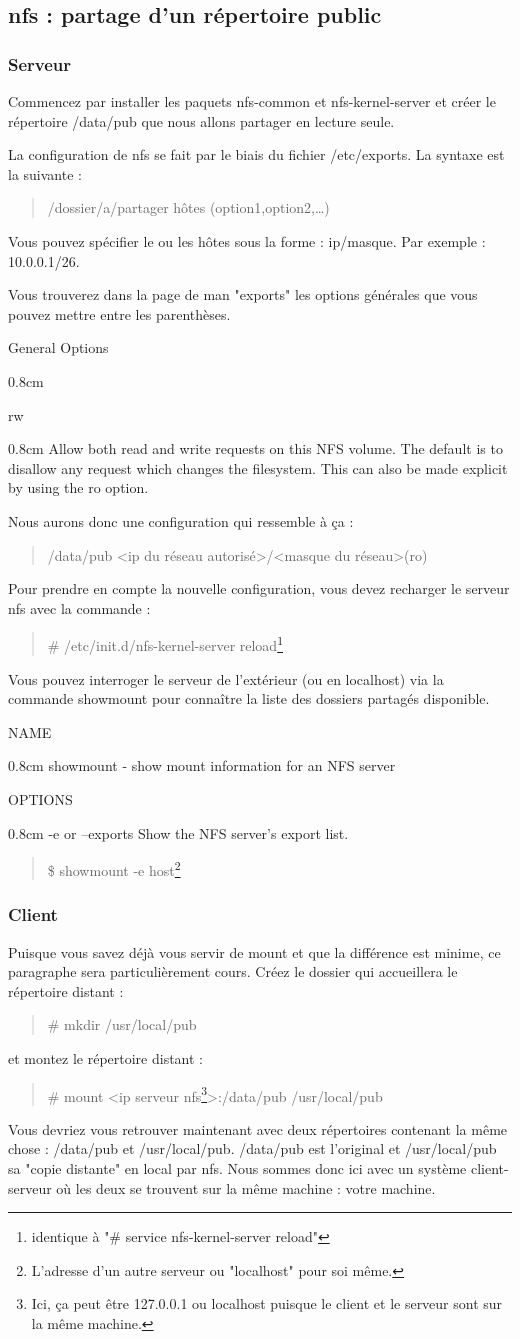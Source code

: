 \documentclass[a4paper,11pt]{article}
\newcommand{\commande}[1] {
    \begin{quote}
    \tt\raggedright #1
    \end{quote}
}
\newcommand{\man}[2]{
    \begin{tcolorbox}[toprule=3mm,width=\textwidth,outer arc=0mm,colbacktitle=grayman,coltitle=black,colback={grayman},colframe={grayman},title={man : \tt #1}]
        \tt\raggedright #2
    \end{tcolorbox}
}
\newcommand{\mandesc}[1]{
    \begin{adjustwidth}{0.8cm}{}
        #1
    \end{adjustwidth}
}
\begin{document}
\subsection{nfs : partage d'un répertoire public}

\subsubsection{Serveur}
\par Commencez par installer les paquets nfs-common et nfs-kernel-server et créer le répertoire /data/pub que nous allons partager en lecture seule.
\par La configuration de nfs se fait par le biais du fichier /etc/exports. La syntaxe est la suivante :
\commande{/dossier/a/partager hôtes (option1,option2,\dots)}
\par Vous pouvez spécifier le ou les hôtes sous la forme : ip/masque. Par exemple : 10.0.0.1/26.
\par Vous trouverez dans la page de man "exports" les options générales que vous pouvez mettre entre les parenthèses.
\man{exports}{
General Options
\mandesc{
rw
\mandesc{Allow both read and write requests on this NFS volume. The default is to disallow any request which changes the filesystem.  This can also be made explicit by using the ro option.}
}}
\par Nous aurons donc une configuration qui ressemble à ça :
\commande{/data/pub <ip du réseau autorisé>/<masque du réseau>(ro)}
\par Pour prendre en compte la nouvelle configuration, vous devez recharger le serveur nfs avec la commande :
\commande{\# /etc/init.d/nfs-kernel-server reload\footnote{identique à "\# service nfs-kernel-server reload"}}
\par Vous pouvez interroger le serveur de l'extérieur (ou en localhost) via la commande showmount pour connaître la liste des dossiers partagés disponible.
\man{showmount}{NAME
\mandesc{showmount - show mount information for an NFS server}
OPTIONS
\mandesc{-e or --exports Show the NFS server's export list.}}
\commande{\$ showmount -e host\footnote{L'adresse d'un autre serveur ou "localhost" pour soi même.}}

\subsubsection{Client}
\par Puisque vous savez déjà vous servir de mount et que la différence est minime, ce paragraphe sera particulièrement cours. Créez le dossier qui accueillera le répertoire distant :
\commande{\# mkdir /usr/local/pub}
et montez le répertoire distant :
\commande{\# mount <ip serveur nfs\footnote{Ici, ça peut être 127.0.0.1 ou localhost puisque le client et le serveur sont sur la même machine.}>:/data/pub /usr/local/pub}
\par Vous devriez vous retrouver maintenant avec deux répertoires contenant la même chose : /data/pub et /usr/local/pub. /data/pub est l'original et /usr/local/pub sa "copie distante" en local par nfs. Nous sommes donc ici avec un système client-serveur où les deux se trouvent sur la même machine : votre machine.
\end{document}
